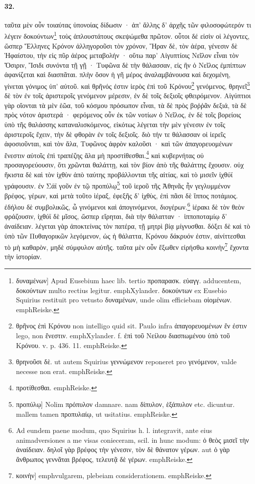 \documentclass[a4paper, 11pt, oneside, polutonikogreek, german]{article}
\begin{document}
\paragraph{32.}
ταῦτα μὲν οὖν τοιαύτας ὑπονοίας δίδωσιν · ἀπ' ἄλλης δ' ἀρχῆς τῶν φιλοσοφώτερόν τι λέγειν δοκούντων\footnote{δυναμένων] Apud Eusebium haec lib. tertio προπαρασκ. εὐαγγ. adducentem, δοκούντων multo rectius legitur. emph{Xylander.} δοκούντων ex Eusebio Squirius restituit pro vetusto δυναμένων, unde olim efficiebam οἰομένων. emph{Reiske.}} τοὺς ἁπλουστάτους σκεψώμεθα πρῶτον. οὗτοι δέ εἰσὶν οἱ λέγοντες, ὥσπερ Ἕλληνες Κρόνον ἀλληγοροῦσι τὸν χρόνον, Ἥραν δὲ, τὸν ἀέρα, γένεσιν δὲ Ἡφαίστου, τὴν εἰς πῦρ ἀέρος μεταβολήν · οὕτω παρ' Αἰγυπτίοις Νεῖλον εἶναι τὸν Ὄσιριν, Ἴσιδι συνόντα τῇ γῇ · Τυφῶνα δὲ τὴν θάλασσαν, εἰς ἣν ὁ Νεῖλος ἐμπίπτων ἀφανίζεται καὶ διασπᾶται. πλὴν ὅσον ἡ γῆ μέρος ἀναλαμβάνουσα καὶ δεχομένη, γίνεται γόνιμος ὑπ' αὐτοῦ. καὶ θρῆνός ἐστιν ἱερὸς ἐπὶ τοῦ Κρόνου\footnote{θρῆνος ἐπὶ Κρόνου non intelligo quid sit. Paulo infra ἀπαγορευομένων ἕν ἐστιν lego, non ἔνεστιν. emph{Xylander.} f. ἐπὶ τοῦ Νείλου διασπωμένου ὑπὸ τοῦ Κρόνου. v. p. 436. 11. emph{Reiske.}} γενόμενος, θρηνεῖ\footnote{θρηνοῦσι δὲ. ut autem Squirius γεννώμενον reponeret pro γενόμενον, valde necesse non erat. emph{Reiske.}} δὲ τὸν ἐν τοῖς ἀριστεροῖς γενόμενον μέρεσιν, ἐν δὲ τοῖς δεξιοῖς φθειρόμενον. Αἰγύπτιοι γὰρ οἴονται τὰ μὲν ἑῶα, τοῦ κόσμου πρόσωπον εἶναι, τὰ δὲ πρὸς βοῤῥᾶν δεξιά, τὰ δὲ πρὸς νότον ἀριστερά · φερόμενος οὖν ἐκ τῶν νοτίων ὁ Νεῖλος, ἐν δὲ τοῖς βορείοις ὑπὸ τῆς θαλάσσης καταναλισκόμενος, εἰκότως λέγεται τὴν μὲν γένεσιν ἐν τοῖς ἀριστεροῖς ἔχειν, τὴν δὲ φθορὰν ἐν τοῖς δεξιοῖς. διὸ τήν τε θάλασσαν οἱ ἱερεῖς ἀφοσιοῦνται, καὶ τὸν ἅλα, Τυφῶνος ἀφρὸν καλοῦσι · καὶ τῶν ἀπαγορευομένων ἕνεστιν αὐτοῖς ἐπὶ τραπέζης ἅλα μὴ προστίθεσθαι.\footnote{προτίθεσθαι. emph{Reiske.}} καὶ κυβερνήτας οὐ προσαγορεύουσιν, ὅτι χρῶνται θαλάττῃ, καὶ τὸν βίον ἀπὸ τῆς θαλάττης ἔχουσιν. οὐχ ἥκιστα δὲ καὶ τὸν ἰχθὺν ἀπὸ ταύτης προβάλλονται τῆς αἰτίας, καὶ τὸ μισεῖν ἰχθύϊ γράφουσιν. ἐν Σάϊ γοῦν ἐν τῷ προπύλῳ\footnote{προπύλῳ] Nolim πρόπυλον damnare. nam δίπυλον, ἑξάπυλον etc. dicuntur. mallem tamen προπυλαίῳ, ut usitatius. emph{Reiske.}} τοῦ ἱεροῦ τῆς Ἀθηνᾶς ἦν γεγλυμμένον βρέφος, γέρων, καὶ μετὰ τοῦτο ἱέραξ, ἐφεξῆς δ' ἰχθὺς, ἐπὶ πᾶσι δὲ ἵππος ποτάμιος. ἐδήλου δὲ συμβολικῶς, ὦ γινόμενοι καὶ ἀπογινόμενοι, διογέρων.\footnote{Ad eundem paene modum, quo Squirius h. l. integravit, ante eius animadversiones a me visas conieceram, scil. in hunc modum: ὁ θεὸς μισεῖ τὴν ἀναίδειαν. δηλοῖ γὰρ βρέφος τὴν γένεσιν, τὸν δὲ θάνατον γέρων. aut ὁ γὰρ ἂνθρωπος γεννᾶται βρέφος, τελευτᾷ δὲ γέρων. emph{Reiske.}} ἱέρακι δὲ τὸν θεὸν φράζουσιν, ἰχθύϊ δὲ μῖσος, ὥσπερ εἴρηται, διὰ τὴν θάλατταν · ἱπποποταμίῳ δ' ἀναίδειαν. λέγεται γὰρ ἀποκτείνας τὸν πατέρα, τῇ μητρὶ βίᾳ μίγνυσθαι. δόξει δὲ καὶ τὸ ὑπὸ τῶν Πυθαγορικῶν λεγόμενον, ὡς ἡ θάλαττα, Κρόνου δάκρυόν ἐστιν, αἰνίττεσθαι τὸ μὴ καθαρὸν, μηδὲ σύμφυλον αὐτῆς. ταῦτα μὲν οὖν ἔξωθεν εἰρήσθω κοινὴν\footnote{κοινὴν] emph{vulgarem, plebeiam considerationem.} emph{Reiske.}} ἔχοντα τὴν ἱστορίαν.
\end{document}
